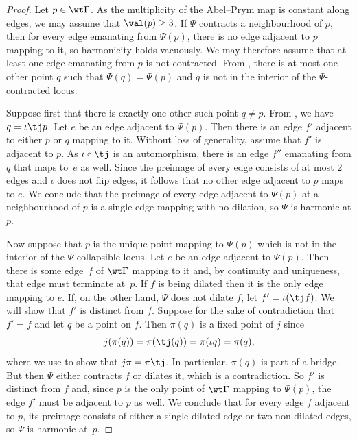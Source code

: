     \begin{proof}

Let $p\in\wt\Gamma$.
     As the multiplicity of the Abel--Prym map is constant along edges, we may assume that $\val(p)\geq 3$.
If $\Psi$ contracts a neighbourhood of $p$, then for every edge emanating from $\Psi(p)$, there is no edge adjacent to $p$ mapping to it, so harmonicity holds vacuously. We may therefore assume that at least one edge emanating from $p$ is not contracted. From , there is at most one other point $q$ such that $\Psi(q) = \Psi(p)$ and $q$ is not in the interior of the $\Psi$-contracted locus.
    
Suppose first that there is exactly one other such point $q\neq p$. From , we have $q = \iota\tj p$. 
Let $e$ be an edge adjacent to $\Psi(p)$. Then there is an edge $f'$ adjacent to either $p$ or $q$ mapping to it. Without loss of generality, assume that $f'$ is adjacent to $p$. As $\iota\circ\tj$ is an automorphism, there is an edge $f''$ emanating from $q$  that maps to~$e$ as well.
Since  the preimage of every edge consists of at most 2 edges and $\iota$ does not flip edges, 
it follows that no other edge adjacent to $p$ maps to $e$.
We conclude that the preimage of every edge adjacent to $\Psi(p)$ at a neighbourhood of $p$ is a single edge mapping with no dilation, so $\Psi$ is harmonic at $p$. 

Now suppose  that $p$ is the unique point  mapping to $\Psi(p)$ which is not in the interior of the $\Psi$-collapsible locus.
Let $e$ be an edge adjacent to $\Psi(p)$. Then there is some edge~$f$ of $\wt\Gamma$ mapping to it and, by continuity and uniqueness, that edge must terminate at~$p$.   If $f$ is being dilated then it is the only edge mapping to $e$. If, on the other hand, 
$\Psi$ does not dilate $f$, let $f' =\iota(\tj f)$. We will show that $f'$ is distinct from $f$. Suppose for the sake of contradiction that $f'=f$ and let $q$ be a point on $f$.   Then $\pi(q)$ is a fixed point of $j$ since 
       \[
       j(\pi(q)) = \pi(\tj (q))  = \pi(\iota q) = \pi(q),
       \]
       where we use  to show that $j\pi = \pi\tj$.
       In particular, $\pi(q)$ is part of a bridge. But then $\Psi$ either contracts $f$ or dilates it, which is a contradiction.  So $f'$ is distinct from $f$ and, since $p$ is the only point of $\wt\Gamma$ mapping to $\Psi(p)$, the edge $f'$ must be adjacent to $p$ as well.
We conclude that for every edge $f$ adjacent to $p$, its preimage consists of either a single dilated edge or two non-dilated edges, so $\Psi$ is harmonic at~$p$. 
\end{proof}



